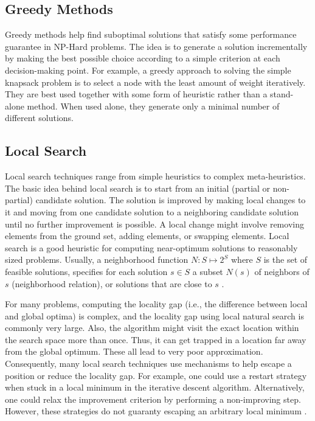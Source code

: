 \subsection{Greedy Methods}
Greedy methods help find suboptimal solutions that satisfy some performance guarantee in NP-Hard problems. The idea is to generate a solution incrementally by making the best possible choice according to a simple criterion at each decision-making point. For example, a greedy approach to solving the simple knapsack problem is to select a node with the least amount of weight iteratively. They are best used together with some form of heuristic rather than a stand-alone method. When used alone, they generate only a minimal number of different solutions.


\subsection{Local Search}
Local search techniques range from simple heuristics to complex meta-heuristics. The basic idea behind local search is to start from an initial (partial or non-partial) \gls{candidate solution}. The solution is improved by making local changes to it and moving from one \gls{candidate solution} to a neighboring \gls{candidate solution} until no further improvement is possible. A local change might involve removing elements from the ground set, adding elements, or swapping elements. Local search is a good heuristic for computing near-optimum solutions to reasonably sized problems. Usually, a neighborhood function $N: S \mapsto 2^S$ where $S $ is the set of feasible solutions, specifies for each solution $s \in S$ a subset $N(s)$ of neighbors of $s$ (neighborhood relation), or solutions that are close to $s$ \parencite{Gonzalez2007HandbookMetaheuristics}.

For many problems, computing the locality gap (i.e., the difference between local and global optima) is complex, and the locality gap using local natural search is commonly very large. Also, the algorithm might visit the exact location within the search space more than once. Thus, it can get trapped in a location far away from the global optimum. These all lead to very poor approximation. Consequently, many local search techniques use mechanisms to help escape a position or reduce the locality gap. For example, one could use a restart strategy when stuck in a local minimum in the iterative descent algorithm. Alternatively, one could relax the improvement criterion by performing a non-improving step. However, these strategies do not guaranty escaping an arbitrary local minimum \parencite{HolgerH2013StochasticApplications}.


